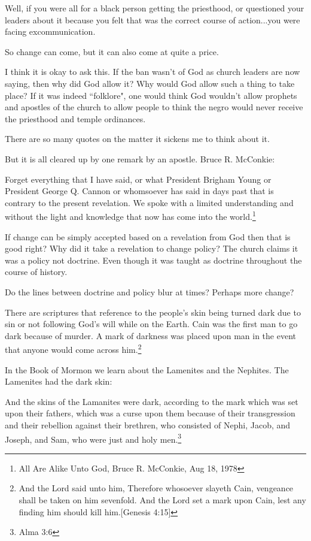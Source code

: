\documentclass{article}
\begin{document}
Well, if you were all for a black person getting the priesthood, or questioned 
your leaders about it because you felt that was the correct course of 
action...you were facing excommunication.

So change can come, but it can also come at quite a price.

I think it is okay to ask this. If the ban wasn't of God as church leaders are 
now saying, then why did God allow it? Why would God allow such a thing to take 
place? If it was indeed ``folklore", one would think God wouldn't allow prophets 
and apostles of the church to allow people to think the negro would never 
receive the priesthood and temple ordinances.

There are so many quotes on the matter it sickens me to think about it.

But it is all cleared up by one remark by an apostle. Bruce R. McConkie:

\begin{displayquote}
Forget everything that I have said, or what President Brigham Young or 
President George Q. Cannon or whomsoever has said in days past that is contrary 
to the present revelation. We spoke with a limited understanding and without the 
light and knowledge that now has come into the world.\footnote{All Are Alike 
Unto God, Bruce R. McConkie, Aug 18, 1978}
\end{displayquote}

If change can be simply accepted based on a revelation from God then that is 
good right? Why did it take a revelation to change policy? The church claims it 
was a policy not doctrine. Even though it was taught as doctrine throughout the 
course of history.

Do the lines between doctrine and policy blur at times? Perhaps more change?

There are scriptures that reference to the people's skin being turned dark due 
to sin or not following God's will while on the Earth. Cain was the first man to 
go dark because of murder. A mark of darkness was placed upon man in the event 
that anyone would come across him.\footnote{And the Lord said unto him, 
Therefore whosoever slayeth Cain, vengeance shall be taken on him sevenfold. 
And the Lord set a mark upon Cain, lest any finding him should kill 
him.[Genesis 4:15]}

In the Book of Mormon we learn about the Lamenites and the Nephites. The 
Lamenites had the dark skin:

\begin{displayquote}
And the skins of the Lamanites were dark, according to the mark which was set 
upon their fathers, which was a curse upon them because of their transgression 
and their rebellion against their brethren, who consisted of Nephi, Jacob, and 
Joseph, and Sam, who were just and holy men.\footnote{Alma 3:6}
\end{displayquote}
\end{document}
